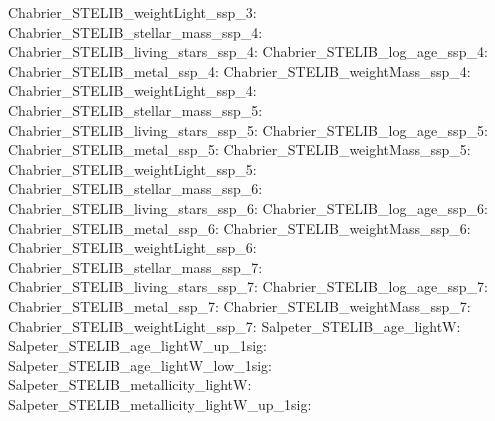 Chabrier\_STELIB\_weightLight\_ssp\_3:  \newline 
Chabrier\_STELIB\_stellar\_mass\_ssp\_4:  \newline 
Chabrier\_STELIB\_living\_stars\_ssp\_4:  \newline 
Chabrier\_STELIB\_log\_age\_ssp\_4:  \newline 
Chabrier\_STELIB\_metal\_ssp\_4:  \newline 
Chabrier\_STELIB\_weightMass\_ssp\_4:  \newline 
Chabrier\_STELIB\_weightLight\_ssp\_4:  \newline 
Chabrier\_STELIB\_stellar\_mass\_ssp\_5:  \newline 
Chabrier\_STELIB\_living\_stars\_ssp\_5:  \newline 
Chabrier\_STELIB\_log\_age\_ssp\_5:  \newline 
Chabrier\_STELIB\_metal\_ssp\_5:  \newline 
Chabrier\_STELIB\_weightMass\_ssp\_5:  \newline 
Chabrier\_STELIB\_weightLight\_ssp\_5:  \newline 
Chabrier\_STELIB\_stellar\_mass\_ssp\_6:  \newline 
Chabrier\_STELIB\_living\_stars\_ssp\_6:  \newline 
Chabrier\_STELIB\_log\_age\_ssp\_6:  \newline 
Chabrier\_STELIB\_metal\_ssp\_6:  \newline 
Chabrier\_STELIB\_weightMass\_ssp\_6:  \newline 
Chabrier\_STELIB\_weightLight\_ssp\_6:  \newline 
Chabrier\_STELIB\_stellar\_mass\_ssp\_7:  \newline 
Chabrier\_STELIB\_living\_stars\_ssp\_7:  \newline 
Chabrier\_STELIB\_log\_age\_ssp\_7:  \newline 
Chabrier\_STELIB\_metal\_ssp\_7:  \newline 
Chabrier\_STELIB\_weightMass\_ssp\_7:  \newline 
Chabrier\_STELIB\_weightLight\_ssp\_7:  \newline 
Salpeter\_STELIB\_age\_lightW:  \newline 
Salpeter\_STELIB\_age\_lightW\_up\_1sig:  \newline 
Salpeter\_STELIB\_age\_lightW\_low\_1sig:  \newline 
Salpeter\_STELIB\_metallicity\_lightW:  \newline 
Salpeter\_STELIB\_metallicity\_lightW\_up\_1sig:  \newline 
